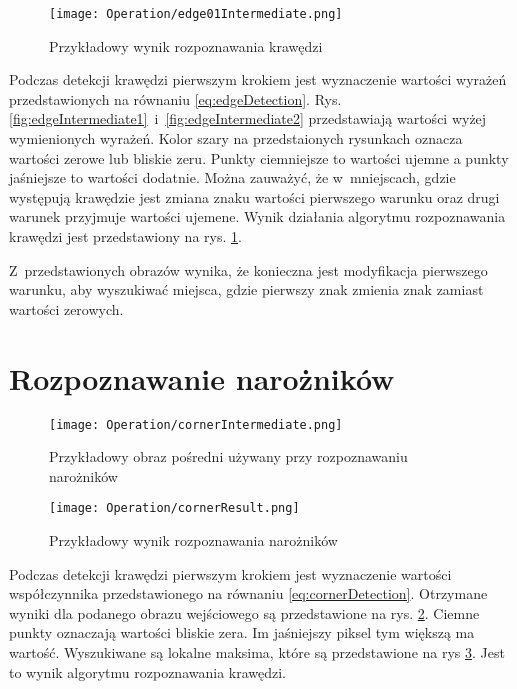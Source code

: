 \begin{figure}[h]
\begin{center}
\texttt{[image: Operation/edge01Intermediate.png]}
\end{center}
\caption{Przykładowy wynik rozpoznawania krawędzi}
\label{fig:edgeResult}
\end{figure}

Podczas detekcji krawędzi pierwszym krokiem jest wyznaczenie wartości wyrażeń przedstawionych na równaniu \eqref{eq:edgeDetection}. Rys. \ref{fig:edgeIntermediate1}~i~\ref{fig:edgeIntermediate2} przedstawiają wartości wyżej wymienionych wyrażeń. Kolor szary na przedstaionych rysunkach oznacza wartości zerowe lub bliskie zeru. Punkty ciemniejsze to wartości ujemne a punkty jaśniejsze to wartości dodatnie. Można zauważyć, że w~mniejscach, gdzie występują krawędzie jest zmiana znaku wartości pierwszego warunku oraz drugi warunek przyjmuje wartości ujemene. Wynik działania algorytmu rozpoznawania krawędzi jest przedstawiony na rys. \ref{fig:edgeResult}.

Z~przedstawionych obrazów wynika, że konieczna jest modyfikacja pierwszego warunku, aby wyszukiwać miejsca, gdzie pierwszy znak zmienia znak zamiast wartości zerowych.

\section{Rozpoznawanie narożników}
\label{sec:dzialanieCorner}

\begin{figure}[h]
\begin{center}
\texttt{[image: Operation/cornerIntermediate.png]}
\end{center}
\caption{Przykładowy obraz pośredni używany przy rozpoznawaniu narożników}
\label{fig:cornerIntermediate}
\end{figure}

\begin{figure}[h]
\begin{center}
\texttt{[image: Operation/cornerResult.png]}
\end{center}
\caption{Przykładowy wynik rozpoznawania narożników}
\label{fig:cornerResult}
\end{figure}

Podczas detekcji krawędzi pierwszym krokiem jest wyznaczenie wartości współczynnika przedstawionego na równaniu \eqref{eq:cornerDetection}. Otrzymane wyniki dla podanego obrazu wejściowego są przedstawione na rys. \ref{fig:cornerIntermediate}. Ciemne punkty oznaczają wartości bliskie zera. Im jaśniejszy piksel tym większą ma wartość. Wyszukiwane są lokalne maksima, które są przedstawione na rys \ref{fig:cornerResult}. Jest to wynik algorytmu rozpoznawania krawędzi.

